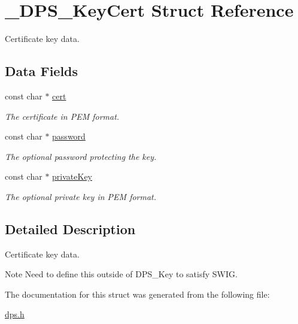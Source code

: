 \hypertarget{struct___d_p_s___key_cert}{}\section{\+\_\+\+D\+P\+S\+\_\+\+Key\+Cert Struct Reference}
\label{struct___d_p_s___key_cert}


Certificate key data.  


\subsection*{Data Fields}
\begin{DoxyCompactItemize}
\item 
\mbox{\label{struct___d_p_s___key_cert_a2783654ef73f2cc58911f40cd6e4f6ba}} 
const char $\ast$ \hyperlink{struct___d_p_s___key_cert_a2783654ef73f2cc58911f40cd6e4f6ba}{cert}
\begin{DoxyCompactList}\small\item\em The certificate in P\+EM format. \end{DoxyCompactList}\item 
\mbox{\label{struct___d_p_s___key_cert_a18f3f492b66fbeb3de6a09aff54369cf}} 
const char $\ast$ \hyperlink{struct___d_p_s___key_cert_a18f3f492b66fbeb3de6a09aff54369cf}{password}
\begin{DoxyCompactList}\small\item\em The optional password protecting the key. \end{DoxyCompactList}\item 
\mbox{\label{struct___d_p_s___key_cert_a0ba1842f3982c930ba76469349b0812d}} 
const char $\ast$ \hyperlink{struct___d_p_s___key_cert_a0ba1842f3982c930ba76469349b0812d}{private\+Key}
\begin{DoxyCompactList}\small\item\em The optional private key in P\+EM format. \end{DoxyCompactList}\end{DoxyCompactItemize}


\subsection{Detailed Description}
Certificate key data. 

\begin{DoxyNote}{Note}
Need to define this outside of D\+P\+S\+\_\+\+Key to satisfy S\+W\+IG. 
\end{DoxyNote}


The documentation for this struct was generated from the following file\+:\begin{DoxyCompactItemize}
\item 
\hyperlink{dps_8h}{dps.\+h}\end{DoxyCompactItemize}
